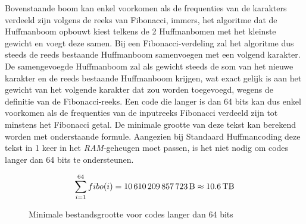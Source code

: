 \noindent Bovenstaande boom kan enkel voorkomen als de frequenties van de karakters verdeeld zijn volgens de reeks van Fibonacci, immers, het algoritme dat de Huffmanboom opbouwt kiest telkens de 2 Huffmanbomen met het kleinste gewicht en voegt deze samen. Bij een Fibonacci-verdeling zal het algoritme dus steeds de reeds bestaande Huffmanboom samenvoegen met een volgend karakter. De samengevoegde Huffmanboom zal als gewicht steeds de som van het nieuwe karakter en de reeds bestaande Huffmanboom krijgen, wat exact gelijk is aan het gewicht van het volgende karakter dat zou worden toegevoegd, wegens de definitie van de Fibonacci-reeks. Een code die langer is dan 64 bits kan dus enkel voorkomen als de frequenties van de inputreeks Fibonacci verdeeld zijn tot minstens het  Fibonacci getal. De minimale grootte van deze tekst kan berekend worden met onderstaande formule. Aangezien bij Standaard Huffmancoding deze tekst in 1 keer in het \emph{RAM}-geheugen moet passen, is het niet nodig om codes langer dan 64 bits te ondersteunen.
\begin{figure}[h]
	$$\sum_{i=1}^{64} fibo(i) = \text{\SI{10610209857723}{\byte}} \approx \SI{10.6}{\tera\byte}$$
	\caption{Minimale bestandsgrootte voor codes langer dan 64 bits}
\end{figure}
